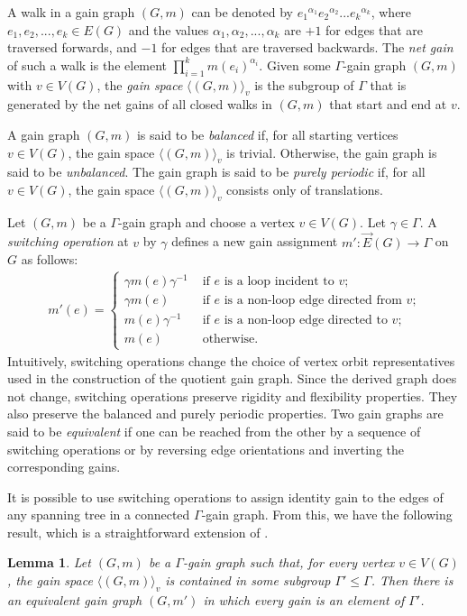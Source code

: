 \documentclass[reqno,a4paper,10pt]{article}
\newtheorem{lemma}[theorem]{Lemma}
\theoremstyle{definition}
\theoremstyle{remark}
\numberwithin{equation}{section}
\numberwithin{figure}{section}
\numberwithin{table}{section}
\begin{document}
    A walk in a gain graph $(G,m)$ can be denoted by ${e_1}^{\alpha_1}{e_2}^{\alpha_2}...{e_k}^{\alpha_k}$, where $e_1,e_2,...,e_k\in E(G)$ and the values $\alpha_1,\alpha_2,...,\alpha_k$ are $+1$ for edges that are traversed forwards, and $-1$ for edges that are traversed backwards. The \emph{net gain} of such a walk is the element $\prod_{i=1}^{k}m(e_i)^{\alpha_i}$. Given some $\Gamma$-gain graph $(G,m)$ with $v\in V(G)$, the \emph{gain space} $\langle(G,m)\rangle_v$ is the subgroup of $\Gamma$ that is generated by the net gains of all closed walks in $(G,m)$ that start and end at $v$.

    A gain graph $(G,m)$ is said to be \emph{balanced} if, for all starting vertices $v\in V(G)$, the gain space $\langle(G,m)\rangle_v$ is trivial. Otherwise, the gain graph is said to be \emph{unbalanced}. The gain graph is said to be \emph{purely periodic} if, for all $v\in V(G)$, the gain space $\langle(G,m)\rangle_v$ consists only of translations.

    Let $(G,m)$ be a $\Gamma$-gain graph and choose a vertex $v\in V(G)$. Let $\gamma\in\Gamma$. A \emph{switching operation} at $v$ by $\gamma$ defines a new gain assignment $m':\vec{E}(G)\to\Gamma$ on $G$ as follows:
    \begin{align*}
			m'(e)=
			\begin{cases}
				\gamma m(e)\gamma^{-1}&\text{ if $e$ is a loop incident to $v$;}\\
				\gamma m(e)&\text{ if $e$ is a non-loop edge directed from $v$;}\\
				m(e)\gamma^{-1}&\text{ if $e$ is a non-loop edge directed to $v$;}\\
				m(e)&\text{ otherwise.}
			\end{cases}
		\end{align*}
        Intuitively, switching operations change the choice of vertex orbit representatives used in the construction of the quotient gain graph. Since the derived graph does not change, switching operations preserve rigidity and flexibility properties. They also preserve the balanced and purely periodic properties. Two gain graphs are said to be \emph{equivalent} if one can be reached from the other by a sequence of switching operations or by reversing edge orientations and inverting the corresponding gains.

        It is possible to use switching operations to assign identity gain to the edges of any spanning tree in a connected $\Gamma$-gain graph. From this, we have the following result, which is a straightforward extension of \cite[Lemma 2.3]{EGRES}.
    \begin{lemma}\label{lemma:swicth}
        Let $(G,m)$ be a $\Gamma$-gain graph such that, for every vertex $v\in V(G)$, the gain space $\langle(G,m)\rangle_v$ is contained in some subgroup $\Gamma'\leq \Gamma$. Then there is an equivalent gain graph $(G,m')$ in which every gain is an element of $\Gamma'$.
    \end{lemma}
\end{document}
